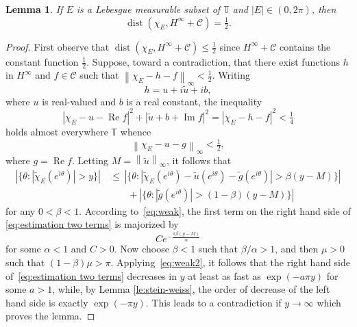 \documentclass[11pt,reqno]{amsart}
\numberwithin{equation}{section}
\theoremstyle{plain}
\newtheorem{Lemma}[equation]{Lemma}
\theoremstyle{definition}
\begin{document}
	\begin{Lemma}\label{Lemma:HC}
		If $E$ is a Lebesgue measurable subset of ${\mathbb{T}}$ and $|E| \in (0, 2 \pi)$, then
		\begin{equation*}
			{\operatorname{dist}}(\chi_E, H^\infty+\mathcal{C})= \tfrac{1}{2}.
		\end{equation*}
	\end{Lemma}
	
	\begin{proof}
		First observe that ${\operatorname{dist}}(\chi_E, H^\infty+\mathcal{C}) \leq \frac{1}{2}$ since $H^{\infty} + \mathcal{C}$ contains the constant function $\frac{1}{2}$.
		Suppose, toward a contradiction, that there exist functions $h$ in $H^\infty$ and $f \in \mathcal{C}$ 
		such that ${\left\| { \chi_E-h-f} \right\|}_\infty< \frac{1}{2}$.  Writing 
		\begin{equation*}
			h=u+i\widetilde u+ib,
		\end{equation*}
		where $u$ is real-valued and $b$ is a real constant, the inequality
		\begin{equation*}
			|\chi_E - u - {\operatorname{Re}f}|^2 +  | \widetilde u + b + {\operatorname{Im}f}|^2 =  |\chi_E-h - f|^2 < \tfrac{1}{4} 
		\end{equation*}
		holds almost everywhere ${\mathbb{T}}$ whence
		\begin{equation*}
			{\left\| { \chi_E-u-  g } \right\|}_\infty < \tfrac{1}{2},
		\end{equation*}
		where $g= {\operatorname{Re}f}$.  Letting $M = {\left\| { \widetilde{u} } \right\|}_{\infty}$, it follows that	
		\begin{equation}\label{eq:estimation two terms}
			\begin{split}
				\left|\{\theta: |\widetilde\chi_E(e^{i \theta})|>y\}\right|
				&\,\leq\, \left|\{\theta: |\widetilde\chi_E(e^{i \theta})-\widetilde u(e^{i \theta})-\widetilde g(e^{i \theta})|>\beta(y-M)\}\right|\\ 
				&\qquad+ \left|\{\theta: |\widetilde g(e^{i \theta})|>(1-\beta)(y-M)\}\right|
			\end{split}
		\end{equation}
		for any $0<\beta<1$.
		According to~\eqref{eq:weak}, the first term on the right hand side of \eqref{eq:estimation two terms} is majorized by 
		$$C e^{-\frac{\pi \beta (y - M)}{\alpha}}$$
		for some $\alpha<1$ and $C > 0$. Now choose $\beta<1$ such that $\beta/\alpha>1$, 
		and then $\mu>0$ such that $(1-\beta)\mu >\pi$. Applying~\eqref{eq:weak2}, it follows that the right 
		hand side of~\eqref{eq:estimation two terms} decreases in $y$ at least as fast as $\exp(-a\pi y)$ for some $a>1$, 
		while, by Lemma \ref{le:stein-weiss}, the order of decrease of the left hand side is exactly $\exp(-\pi y)$. 
		This leads to a contradiction if $y\to\infty$ which proves the lemma.
	\end{proof}
\end{document}
